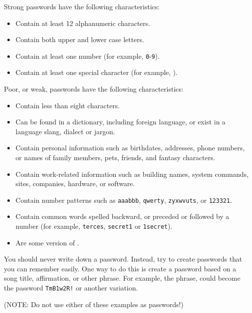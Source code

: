 Strong passwords have the following characteristics:
\begin{itemize}
\item
Contain at least 12 alphanumeric characters.
\item
Contain both upper and lower case letters. 
\item
Contain at least one number (for example, \texttt{0}-\texttt{9}).
\item
Contain at least one special character (for example, ).
\end{itemize}
Poor, or weak, passwords have the following characteristics: 
\begin{itemize}
\item
Contain less than eight characters.
\item
Can be found in a dictionary, including foreign language, or exist in a language slang, dialect\oxford{} or jargon.
\item
Contain personal information such as birthdates, addresses, phone numbers, or names of family members, pets, friends, and fantasy characters.
\item
Contain work-related information such as building names, system commands, sites, companies, hardware, or software.
\item
Contain number patterns such as \texttt{aaabbb}, \texttt{qwerty}, \texttt{zyxwvuts}, or \texttt{123321}.
\item
Contain common words spelled backward, or preceded or followed by a number (for example, \texttt{terces}, \texttt{secret1} or \texttt{1secret}).
\item
Are some version of \oldnew{}{,}  .
\end{itemize}
You should never write down a password.  
Instead, try to create passwords that you can remember easily.  
One way to do this is create a password based on a song title, affirmation, or other phrase.  
For example, the phrase,  could become the password \texttt{TmB1w2R!} or another variation.

(NOTE: Do not use either of these examples as passwords!)


